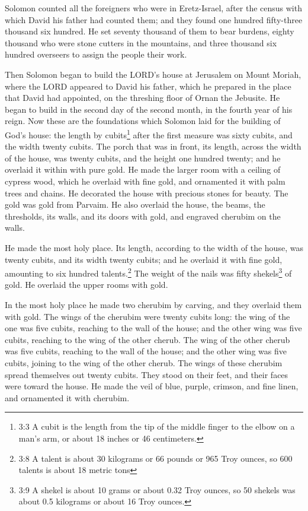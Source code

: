\myverse{}Solomon counted all the foreigners who were in Eretz-Israel,
after the census with which David his father had counted them; and they found one hundred fifty-three
thousand six hundred.
\myverse{}He set seventy thousand of them to bear burdens, eighty thousand who were
stone cutters in the mountains, and three thousand six hundred overseers to assign the people their work.


\mychapter{} \myverse*{}Then Solomon began to build the LORD’s house at Jerusalem on Mount
Moriah, where the LORD appeared to David his father, which he prepared in the place that David had appointed,
on the threshing floor of Ornan the Jebusite.
\myverse{}He began to build in the second day of the second month, in the fourth year
of his reign.
\myverse{}Now these are the foundations which Solomon laid for the building of God’s house:
the length by cubits\footnote{3:3 A cubit is the length from the tip of the middle finger to the elbow on a man’s arm, or about
	18 inches or 46 centimeters.} after the first measure was sixty cubits, and the width twenty cubits.
\myverse{}The porch that was in front, its length, across the width of the house, was
twenty cubits, and the height one hundred twenty; and he overlaid it within with pure gold.
\myverse{}He made the larger room with a ceiling of cypress wood, which he overlaid with
fine gold, and ornamented it with palm trees and chains.
\myverse{}He decorated the house with precious stones for beauty. The gold was gold from
Parvaim.
\myverse{}He also overlaid the house, the beams, the thresholds, its walls, and its doors
with gold, and engraved cherubim on the walls.

\myverse{}He made the most holy place. Its length, according to the width
of the house, was twenty cubits, and its width twenty cubits; and he overlaid it with fine gold, amounting
to six hundred talents.\footnote{3:8 A talent is about 30 kilograms or 66 pounds or 965 Troy ounces, so 600 talents is about 18 metric
	tons}
\myverse{}The weight of the nails was fifty shekels\footnote{3:9 A shekel is about 10 grams or about 0.32 Troy ounces, so 50 shekels was about 0.5 kilograms or
	about 16 Troy ounces.} of gold. He overlaid the upper rooms with gold.

\myverse{}In the most holy place he made two cherubim by carving, and they
overlaid them with gold.
\myverse{}The wings of the cherubim were twenty cubits long: the wing of the one was
five cubits, reaching to the wall of the house; and the other wing was five cubits, reaching to the wing
of the other cherub.
\myverse{}The wing of the other cherub was five cubits, reaching to the wall of the
house; and the other wing was five cubits, joining to the wing of the other cherub.
\myverse{}The wings of these cherubim spread themselves out twenty cubits. They stood
on their feet, and their faces were toward the house.
\myverse{}He made the veil of blue, purple, crimson, and fine linen, and ornamented
it with cherubim.

